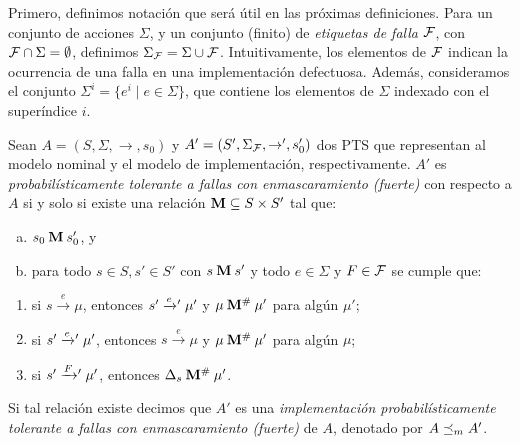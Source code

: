 Primero, definimos notación que será útil en las próximas definiciones.
Para un conjunto de acciones $\Sigma$, y un conjunto (finito) de \emph{etiquetas de falla} $\mathcal{F}$, con $\mathcal{F}\cap\Sigma=\emptyset$, definimos $\Sigma_{\mathcal{F}}
= \Sigma \cup \mathcal{F}$.  Intuitivamente, los elementos de $\mathcal{F}$
indican la ocurrencia de una falla en una implementación defectuosa.
Además, consideramos el conjunto $\Sigma^i = \{ e^i
\mid e \in \Sigma\}$, que contiene los elementos de 
 $\Sigma$ indexado con el superíndice $i$.

\begin{definition} \label{def:masking_rel_prob}
  Sean $A =( S, \Sigma, {\rightarrow}, s_0 )$ y
  $A' =( S', \Sigma_{\mathcal{F}}, {\rightarrow'}, s_0' )$ dos PTS que representan al modelo nominal y el modelo de implementación, respectivamente.
  $A'$ es \emph{probabilísticamente tolerante a fallas con enmascaramiento (fuerte)} con respecto a $A$ si y solo si existe una relación $\mathbin{\mathbf{M}} \subseteq S \times S'$
  tal que:
  \begin{enumerate}[(a)]
  \item%
    $s_0 \mathbin{\mathbf{M}} s'_0$, y
  \item%
    para todo $s \in S, s' \in S'$ con $s \mathbin{\mathbf{M}} s'$ y todo $e \in \Sigma$
    y $F \in \mathcal{F}$ se cumple que:
  \end{enumerate}%
 \begin{enumerate}[(1)]
  \item%
    si $s \xrightarrow{e} \mu$, entonces $s' \mathrel{{\xrightarrow[]{e}}{}'} \mu'$ y
    $\mu \mathbin{\mathbf{M^{\#}}} \mu'$ para algún $\mu'$;
  \item%
    si $s' \mathrel{{\xrightarrow[]{e}}{}'} \mu'$, entonces $s \xrightarrow{e} \mu$ y
    $\mu \mathbin{\mathbf{M^{\#}}} \mu'$ para algún $\mu$;
  \item%
    si $s' \mathrel{{\xrightarrow[]{F}}{}'} \mu'$, entonces $\Delta_s \mathbin{\mathbf{M^{\#}}} \mu'$.
  \end{enumerate}
  Si tal relación existe decimos que $A'$ es una \emph{implementación probabilísticamente tolerante a fallas con enmascaramiento (fuerte)} de $A$, 
    denotado por $A \preceq_{m} A'$.
\end{definition}

